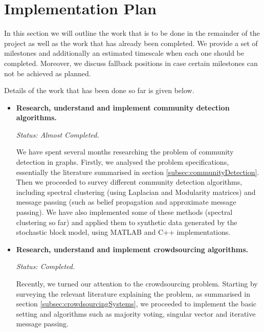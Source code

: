 \documentclass[12pt]{article}
\numberwithin{equation}{section}
\begin{document}

\newpage
\thispagestyle{plain}
\mbox{}
\section {Implementation Plan}
\label{sec:implementationPlan}

In this section we will outline the work that is to be done in the remainder of the project as well as the work that has already been completed. We provide a set of milestones and additionally an estimated timescale when each one should be completed. Moreover, we discuss fallback positions in case certain milestones can not be achieved as planned.

Details of the work that has been done so far is given below.
\begin{itemize}
	\item \textbf{Research, understand and implement community detection algorithms.}

	\textit{Status: Almost Completed.}	

	We have spent several months researching the problem of community detection in graphs. Firstly, we analysed the problem specifications, essentially the literature summarised in section \ref{subsec:communityDetection}. Then we proceeded to survey different community detection algorithms, including spectral clustering (using Laplacian and Modularity matrices) and message passing (such as belief propagation and approximate message passing). We have also implemented some of these methods (spectral clustering so far) and applied them to synthetic data generated by the stochastic block model, using MATLAB and C++ implementations.

	\item \textbf{Research, understand and implement crowdsourcing algorithms.}

	\textit{Status: Completed.}

	Recently, we turned our attention to the crowdsourcing problem. Starting by surveying the relevant literature explaining the problem, as summarised in section \ref{subsec:crowdsourcingSystems}, we proceeded to implement the basic setting and algorithms such as majority voting, singular vector and iterative message passing.
\end{itemize}
\end{document}
